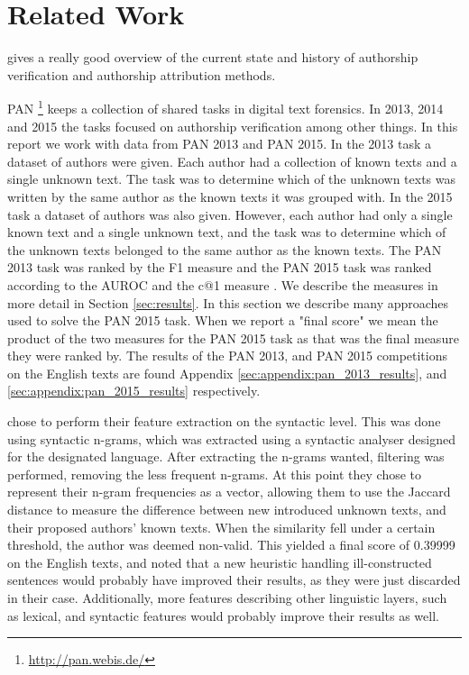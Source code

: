 \section{Related Work} \label{sec:related_work}
\cite{stamatos2009} gives a really good overview of the current state and
history of authorship verification and authorship attribution methods.

PAN \footnote{\url{http://pan.webis.de/}} keeps a collection of shared tasks in
digital text forensics. In 2013, 2014 and 2015 the tasks focused on authorship
verification among other things. In this report we work with data from PAN 2013
and PAN 2015. In the 2013 task a dataset of authors were given. Each author
had a collection of known texts and a single unknown text. The task was to
determine which of the unknown texts was written by the same author as the
known texts it was grouped with. In the 2015 task a dataset of authors was also
given. However, each author had only a single known text and a single unknown
text, and the task was to determine which of the unknown texts belonged to
the same author as the known texts. The PAN 2013 task was ranked by the F1
measure and the PAN 2015 task was ranked according to the \gls{AUROC} and
the c@1 measure \cite{penas2011}. We describe the measures in more detail in
Section \ref{sec:results}. In this section we describe many approaches used to
solve the PAN 2015 task. When we report a "final score" we mean the product
of the two measures for the PAN 2015 task as that was the final measure they
were ranked by. The results of the PAN 2013, and PAN 2015 competitions on the
English texts are found Appendix \ref{sec:appendix:pan_2013_results}, and
\ref{sec:appendix:pan_2015_results} respectively.

\cite{juanpablo2015} chose to perform their feature extraction on the syntactic
level. This was done using syntactic n-grams, which was extracted using a
syntactic analyser designed for the designated language. After extracting the
n-grams wanted, filtering was performed, removing the less frequent n-grams.
At this point they chose to represent their n-gram frequencies as a vector,
allowing them to use the Jaccard distance to measure the difference between new
introduced unknown texts, and their proposed authors' known texts. When the
similarity fell under a certain threshold, the author was deemed non-valid. This
yielded a final score of 0.39999 on the English texts, and \cite{juanpablo2015}
noted that a new heuristic handling ill-constructed sentences would probably
have improved their results, as they were just discarded in their case.
Additionally, more features describing other linguistic layers, such as lexical,
and syntactic features would probably improve their results as well.

